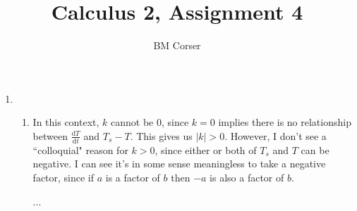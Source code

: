 \documentclass[10pt]{article}
\author{BM Corser}
\title{Calculus 2, Assignment 4}
\date{}
\newcommand*{\dTdt}[0]{\frac{\text{d}T}{\text{d}t}}
\begin{document}
    \maketitle 
    \begin{enumerate}
        \item 
        \begin{enumerate}
            \item In this context, $k$ cannot be 0, since $k = 0$ implies there
                is no relationship between $\dTdt$ and $T_s - T$. This gives us
                $|k| > 0$. However, I don't see a ``colloquial" reason for $k >
                0$, since either or both of $T_s$ and $T$ can be negative. I
                can see it's in some sense meaningless to take a negative
                factor, since if $a$ is a factor of $b$ then $-a$ is also a
                factor of $b$.

                ...


\end{enumerate}
\end{enumerate}
\end{document}
